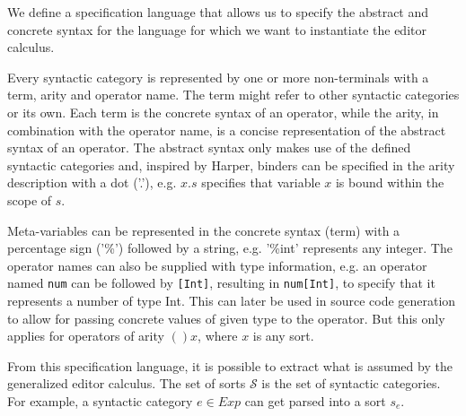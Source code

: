 \documentclass[sigplan,screen]{acmart}
\begin{document}

We define a specification language that allows us to specify the
abstract and concrete syntax for the language for which we want to
instantiate the editor calculus.


Every syntactic category is represented by one or more non-terminals
with a term, arity and operator name. The term might refer to other
syntactic categories or its own. Each term is the concrete syntax of
an operator, while the arity, in combination with the operator name,
is a concise representation of the abstract syntax of an operator.
The abstract syntax only makes use of the defined syntactic categories
and, inspired by Harper\cite{harper_foundations}, binders can be
specified in the arity description with a dot ('.'), e.g. $x.s$
specifies that variable $x$ is bound within the scope of $s$.

Meta-variables can be represented in the concrete syntax (term) with a
percentage sign ('\%') followed by a string, e.g. '\%int' represents
any integer. The operator names can also be supplied with type
information, e.g. an operator named \texttt{num} can be followed by
\texttt{[Int]}, resulting in \texttt{num[Int]}, to specify that it
represents a number of type Int. This can later be used in source code
generation to allow for passing concrete values of given type to the
operator. But this only applies for operators of arity $()x$, where
$x$ is any sort.

From this specification language, it is possible to extract what is assumed by the generalized editor calculus. The set of sorts $\mathcal{S}$ is the set of syntactic categories. For example, a syntactic category $e \in Exp$ can get parsed into a sort $s_{e}$.
\end{document}
